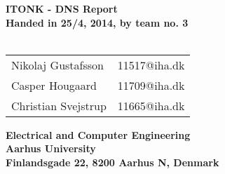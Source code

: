 
\begin{titlepage}
\begin{center}
{\LARGE \textbf{ITONK - DNS Report}}\\


\vspace{4cm}
\textbf{Handed in 25/4, 2014, by team no. 3}\\~\\
\begin{tabular}{ll}
Nikolaj Gustafsson  & 11517@iha.dk \\
Casper Hougaard  & 11709@iha.dk \\
Christian Svejstrup  & 11665@iha.dk \\
\end{tabular}
\vfill
\textbf{Electrical and Computer Engineering}\\
\textbf{Aarhus University}\\
\textbf{Finlandsgade 22, 8200 Aarhus N, Denmark}
\end{center}
\end{titlepage}